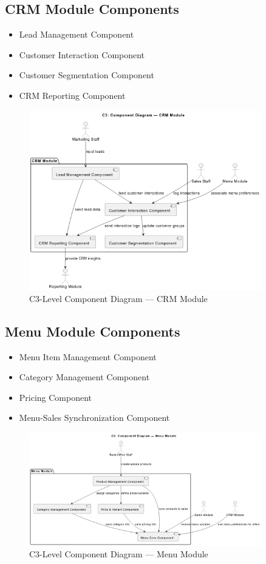 \subsection*{CRM Module Components}
\begin{itemize}
    \item Lead Management Component
    \item Customer Interaction Component
    \item Customer Segmentation Component
    \item CRM Reporting Component
\end{itemize}

\begin{figure}[H]
\centering
\includegraphics[width=0.9\textwidth,keepaspectratio]{diagrams/C3_crm.png}
\caption{C3-Level Component Diagram — CRM Module}
\end{figure}

\subsection*{Menu Module Components}
\begin{itemize}
    \item Menu Item Management Component
    \item Category Management Component
    \item Pricing Component
    \item Menu-Sales Synchronization Component
\end{itemize}

\begin{figure}[H]
\centering
\includegraphics[width=0.9\textwidth,keepaspectratio]{diagrams/C3_menu.png}
\caption{C3-Level Component Diagram — Menu Module}
\end{figure}

